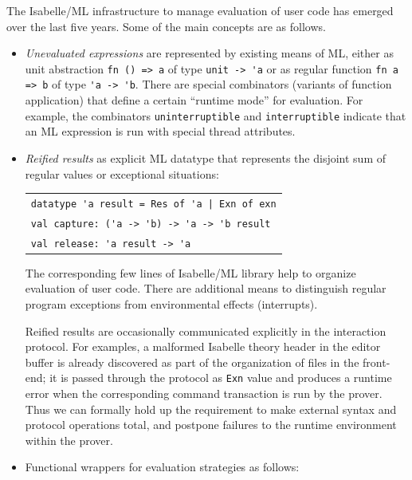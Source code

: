 \begin{isabellebody}
\begin{isamarkuptext}
   The Isabelle/ML infrastructure to
  manage evaluation of user code has emerged over the last five years.
  Some of the main concepts are as follows.

  \begin{itemize}

  \item \emph{Unevaluated expressions} are represented by existing
  means of ML, either as unit abstraction \verb|fn () => a| of
  type \verb|unit -> 'a| or as regular function
  \verb|fn a => b| of type \verb|'a -> 'b|.  There are special
  combinators (variants of function application) that define a certain
  ``runtime mode'' for evaluation.  For example, the combinators \verb|uninterruptible| and \verb|interruptible| indicate that an ML
  expression is run with special thread attributes.

  \item \emph{Reified results} as explicit ML datatype that represents
  the disjoint sum of regular values or exceptional situations:

  \medskip
  \begin{tabular}{l}
  \verb|datatype 'a result = Res of 'a |\verb,|,\verb| Exn of exn| \\
  \verb|val capture: ('a -> 'b) -> 'a -> 'b result| \\
  \verb|val release: 'a result -> 'a| \\
  \end{tabular}

  The corresponding few lines of Isabelle/ML library help to organize
  evaluation of user code.  There are additional means to distinguish
  regular program exceptions from environmental effects (interrupts).

  Reified results are occasionally communicated explicitly in the
  interaction protocol.  For examples, a malformed Isabelle theory
  header in the editor buffer is already discovered as part of the
  organization of files in the front-end; it is passed through the
  protocol as \verb|Exn| value and produces a runtime error when
  the corresponding command transaction is run by the prover.  Thus we
  can formally hold up the requirement to make external syntax and
  protocol operations total, and postpone failures to the runtime
  environment within the prover.

  \item Functional wrappers for evaluation strategies as follows:

  \begin{itemize}


\end{itemize}
\end{itemize}
\end{isamarkuptext}
\end{isabellebody}
